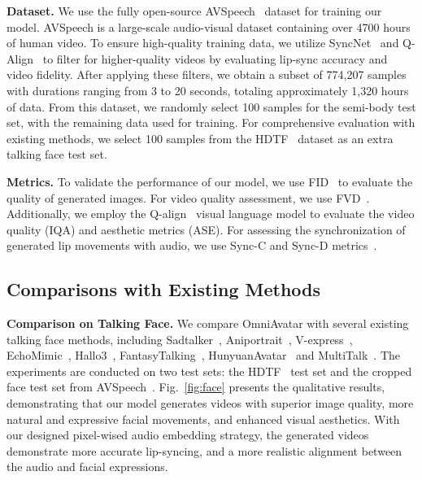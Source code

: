 \noindent\textbf{Dataset.}
We use the fully open-source AVSpeech~\cite{ephrat2018looking} dataset for training our model. AVSpeech is a large-scale audio-visual dataset containing over 4700 hours of human video. To ensure high-quality training data, we utilize SyncNet~\cite{chung2017out} and Q-Align~\cite{wu2023q} to filter for higher-quality videos by evaluating lip-sync accuracy and video fidelity.
After applying these filters, we obtain a subset of 774,207 samples with durations ranging from 3 to 20 seconds, totaling approximately 1,320 hours of data. From this dataset, we randomly select 100 samples for the semi-body test set, with the remaining data used for training. For comprehensive evaluation with existing methods, we select 100 samples from the HDTF~\cite{zhang2021flow} dataset as an extra talking face test set.

\noindent\textbf{Metrics.}
To validate the performance of our model, we use FID~\cite{heusel2017gans} to evaluate the quality of generated images. For video quality assessment, we use FVD~\cite{unterthiner2018towards}. Additionally, we employ the Q-align~\cite{wu2023q} visual language model to evaluate the video quality (IQA) and aesthetic metrics (ASE). For assessing the synchronization of generated lip movements with audio, we use Sync-C and Sync-D metrics~\cite{chung2017out}.


\subsection{Comparisons with Existing Methods}


\noindent\textbf{Comparison on Talking Face.} We compare OmniAvatar with several existing talking face methods, including Sadtalker~\cite{zhang2023sadtalker}, Aniportrait~\cite{wei2024aniportrait}, V-express~\cite{wang2024v}, EchoMimic~\cite{chen2025echomimic}, Hallo3~\cite{cui2024hallo3}, FantasyTalking~\cite{wang2025fantasytalking},  HunyuanAvatar~\cite{chen2025hunyuanvideoavatar} and MultiTalk~\cite{kong2025let}. The experiments are conducted on two test sets: the HDTF~\cite{zhang2021flow} test set and the cropped face test set from AVSpeech~\cite{ephrat2018looking}. Fig.~\ref{fig:face} presents the qualitative results, demonstrating that our model generates videos with superior image quality, more natural and expressive facial movements, and enhanced visual aesthetics. With our designed pixel-wised audio embedding strategy, the generated videos demonstrate more accurate lip-syncing, and a more realistic alignment between the audio and facial expressions. 

